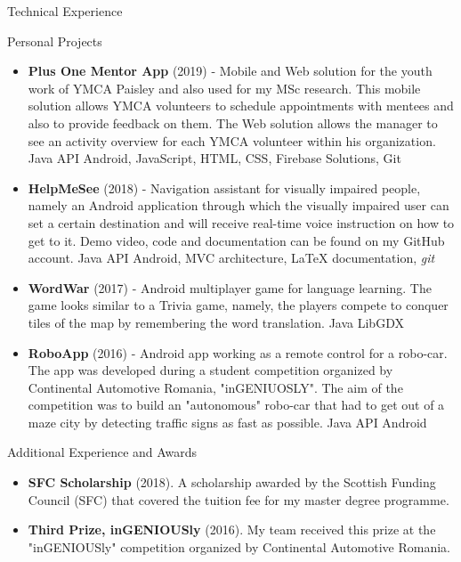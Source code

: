 \documentclass[]{mcdowellcv}
\begin{document}
	\begin{cvsection}{Technical Experience}
		\begin{cvsubsection}{Personal Projects}{}{}
			\begin{itemize}
				\item \textbf{Plus One Mentor App} (2019) - Mobile and Web solution for the youth work of YMCA Paisley and also used for my MSc research. This mobile solution allows YMCA volunteers to schedule appointments with mentees and also to provide feedback on them. The Web solution allows the manager to see an activity overview for each YMCA volunteer within his organization. Java API Android, JavaScript, HTML, CSS, Firebase Solutions, Git
				\item \textbf{HelpMeSee} (2018) - Navigation assistant for visually impaired people, namely an Android application through which the visually impaired user can set a certain destination and will receive real-time voice instruction on how to get to it. Demo video, code and documentation can be found on my GitHub account. Java API Android, MVC architecture, LaTeX documentation, \textit{git}
				\item \textbf{WordWar} (2017) - Android multiplayer game for language learning. The game looks similar to a Trivia game, namely, the players compete to conquer tiles of the map by remembering the word translation. Java LibGDX
        \item \textbf{RoboApp} (2016) - Android app working as a remote control for a robo-car. The app was developed during a student competition organized by Continental Automotive Romania, "inGENIUOSLY". The aim of the competition was to build an "autonomous" robo-car that had to get out of a maze city by detecting traffic signs as fast as possible. Java API Android
			\end{itemize}
		\end{cvsubsection}
	\end{cvsection}
	
	\begin{cvsection}{Additional Experience and Awards}
		\begin{cvsubsection}{}{}{}	
			\begin{itemize}
				\item \textbf{SFC Scholarship} (2018). A scholarship awarded by the Scottish Funding Council (SFC) that covered the tuition fee for my master degree programme.
				\item \textbf{Third Prize, inGENIOUSly} (2016). My team received this prize at the "inGENIOUSly" competition organized by Continental Automotive Romania.
			\end{itemize}
		\end{cvsubsection}
	\end{cvsection}
\end{document}
